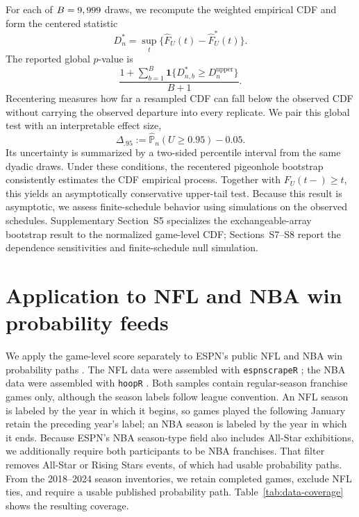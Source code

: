 \documentclass[12pt,letterpaper]{article}  %
\renewcommand{\P}{\mathbb{P}}
\theoremstyle{plain}
\theoremstyle{definition}
\begin{document}
For each of $B=9,999$ draws, we recompute the weighted empirical CDF and form the centered statistic
\[
D_n^*=\sup_t\{\hat F_U(t)-\hat F_U^*(t)\}.
\]
The reported global $p$-value is
\[
\frac{1+\sum_{b=1}^B \mathbf 1\{D_{n,b}^*\ge D_n^{\mathrm{upper}}\}}{B+1}.
\]
Recentering measures how far a resampled CDF can fall below the observed CDF without carrying the observed departure into every replicate.
We pair this global test with an interpretable effect size,
\[
\Delta_{.95}:=\widehat{\P}_n(U\ge0.95)-0.05.
\]
Its uncertainty is summarized by a two-sided percentile interval from the same dyadic draws.
Under these conditions, the recentered pigeonhole bootstrap consistently estimates the CDF empirical process.
Together with $F_U(t-)\ge t$, this yields an asymptotically conservative upper-tail test.
Because this result is asymptotic, we assess finite-schedule behavior using simulations on the observed schedules.
Supplementary Section~S5 specializes the exchangeable-array bootstrap result to the normalized game-level CDF; Sections~S7--S8 report the dependence sensitivities and finite-schedule null simulation.

\section{Application to NFL and NBA win probability feeds} \label{sec:empirical}

We apply the game-level score separately to ESPN's public NFL and NBA win probability paths \citep{ESPN2025}.
The NFL data were assembled with \texttt{espnscrapeR} \citep{espnscrapeR2025}; the NBA data were assembled with \texttt{hoopR} \citep{hoopR2023}.
Both samples contain regular-season franchise games only, although the season labels follow league convention.
An NFL season is labeled by the year in which it begins, so games played the following January retain the preceding year's label; an NBA season is labeled by the year in which it ends.
Because ESPN's NBA season-type field also includes All-Star exhibitions, we additionally require both participants to be NBA franchises.
That filter removes \NBAExcludedExhibitionEvents{} All-Star or Rising Stars events, \NBAExcludedExhibitionFeeds{} of which had usable probability paths.
From the 2018--2024 season inventories, we retain completed games, exclude NFL ties, and require a usable published probability path.
Table~\ref{tab:data-coverage} shows the resulting coverage.
\end{document}
